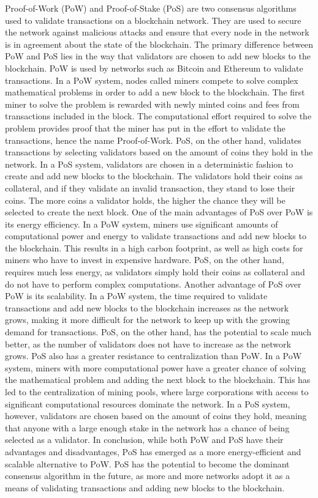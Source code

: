 \documentclass[target=mst,aauheader=]{thud}
\begin{document}
    Proof-of-Work (PoW) and Proof-of-Stake (PoS) are two consensus algorithms used to validate transactions on a blockchain network. They are used to secure the network against malicious attacks and ensure that every node in the network is in agreement about the state of the blockchain. The primary difference between PoW and PoS lies in the way that validators are chosen to add new blocks to the blockchain.
    PoW is used by networks such as Bitcoin and Ethereum to validate transactions. In a PoW system, nodes called miners compete to solve complex mathematical problems in order to add a new block to the blockchain. The first miner to solve the problem is rewarded with newly minted coins and fees from transactions included in the block. The computational effort required to solve the problem provides proof that the miner has put in the effort to validate the transactions, hence the name Proof-of-Work.
    PoS, on the other hand, validates transactions by selecting validators based on the amount of coins they hold in the network. In a PoS system, validators are chosen in a deterministic fashion to create and add new blocks to the blockchain. The validators hold their coins as collateral, and if they validate an invalid transaction, they stand to lose their coins. The more coins a validator holds, the higher the chance they will be selected to create the next block.
    One of the main advantages of PoS over PoW is its energy efficiency. In a PoW system, miners use significant amounts of computational power and energy to validate transactions and add new blocks to the blockchain. This results in a high carbon footprint, as well as high costs for miners who have to invest in expensive hardware. PoS, on the other hand, requires much less energy, as validators simply hold their coins as collateral and do not have to perform complex computations.
    Another advantage of PoS over PoW is its scalability. In a PoW system, the time required to validate transactions and add new blocks to the blockchain increases as the network grows, making it more difficult for the network to keep up with the growing demand for transactions. PoS, on the other hand, has the potential to scale much better, as the number of validators does not have to increase as the network grows.
    PoS also has a greater resistance to centralization than PoW. In a PoW system, miners with more computational power have a greater chance of solving the mathematical problem and adding the next block to the blockchain. This has led to the centralization of mining pools, where large corporations with access to significant computational resources dominate the network. In a PoS system, however, validators are chosen based on the amount of coins they hold, meaning that anyone with a large enough stake in the network has a chance of being selected as a validator.
    In conclusion, while both PoW and PoS have their advantages and disadvantages, PoS has emerged as a more energy-efficient and scalable alternative to PoW. PoS has the potential to become the dominant consensus algorithm in the future, as more and more networks adopt it as a means of validating transactions and adding new blocks to the blockchain.    
\end{document}
